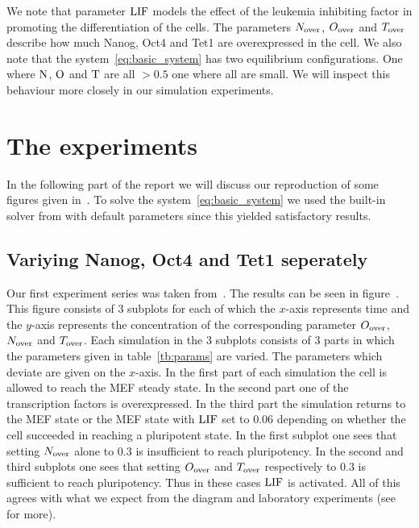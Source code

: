 We note that parameter $\text{LIF}$ models the effect of the leukemia inhibiting factor in promoting 
the differentiation of the cells. The parameters $N_\text{over}$, $O_\text{over}$ and $T_\text{over}$ describe how much
Nanog, Oct4 and Tet1 are overexpressed in the cell.
We also note that the system~\eqref{eq:basic_system} has two equilibrium configurations.
One where $\text{N}$, $\text{O}$ and $\text{T}$ are all $>0.5$ one where all are small. We will inspect
this behaviour more closely in our simulation experiments.

\section{The experiments}

In the following part of the report we will discuss our reproduction of some figures given in~\cite{Olariu2016}.
To solve the system~\eqref{eq:basic_system} we used the built-in solver from  with default parameters since this yielded satisfactory results.

\subsection{Variying Nanog, Oct4 and Tet1 seperately}

Our first experiment series was taken from~\cite{Olariu2016}.
The results can be seen in figure~\cite{pl:NOT_0.3}. This figure consists of 3 subplots 
for each of which the $x$-axis represents time and the $y$-axis represents the concentration of the 
corresponding parameter $O_\text{over}$, $N_\text{over}$ and $T_\text{over}$. Each simulation in the 3 subplots consists of 
3 parts in which the parameters given in table~\ref{tb:params} are varied. The parameters which deviate are
given on the $x$-axis. In the first part of each simulation the cell is allowed to reach the MEF steady state. 
In the second part one of the transcription factors is overexpressed.
In the third part the simulation returns to the MEF state or the MEF state with $\text{LIF}$ set to $0.06$
depending on whether the cell succeeded in reaching a pluripotent state.
In the first subplot one sees that setting $N_\text{over}$ alone to $0.3$ is insufficient to reach pluripotency.
In the second and third subplots one sees that setting $O_\text{over}$ and $T_\text{over}$ respectively to $0.3$ is sufficient
to reach pluripotency. Thus in these cases $\text{LIF}$ is activated.
All of this agrees with what we expect from the diagram and laboratory experiments (see~\cite{Olariu2016} for more).

